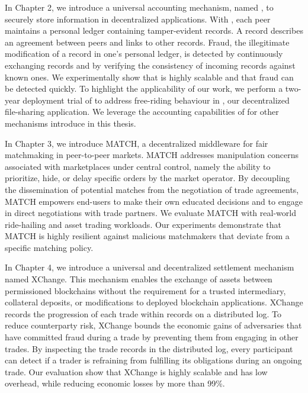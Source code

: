 In Chapter 2, we introduce a universal accounting mechanism, named \TrustChain{}, to securely store information in decentralized applications.
With \TrustChain{}, each peer maintains a personal ledger containing tamper-evident records.
A record describes an agreement between peers and links to other records.
Fraud, the illegitimate modification of a record in one's personal ledger, is detected by continuously exchanging records and by verifying the consistency of incoming records against known ones.
We experimentally show that \TrustChain{} is highly scalable and that fraud can be detected quickly.
To highlight the applicability of our work, we perform a two-year deployment trial of \TrustChain{} to address free-riding behaviour in \Tribler{}, our decentralized file-sharing application.
We leverage the accounting capabilities of \TrustChain{} for other mechanisms introduce in this thesis.

In Chapter 3, we introduce MATCH, a decentralized middleware for fair matchmaking in peer-to-peer markets.
MATCH addresses manipulation concerns associated with marketplaces under central control, namely the ability to prioritize, hide, or delay specific orders by the market operator.
By decoupling the dissemination of potential matches from the negotiation of trade agreements, MATCH empowers end-users to make their own educated decisions and to engage in direct negotiations with trade partners.
We evaluate MATCH with real-world ride-hailing and asset trading workloads.
Our experiments demonstrate that MATCH is highly resilient against malicious matchmakers that deviate from a specific matching policy.

In Chapter 4, we introduce a universal and decentralized settlement mechanism named XChange.
This mechanism enables the exchange of assets between permissioned blockchains without the requirement for a trusted intermediary, collateral deposits, or modifications to deployed blockchain applications.
XChange records the progression of each trade within records on a distributed log.
To reduce counterparty risk, XChange bounds the economic gains of adversaries that have committed fraud during a trade by preventing them from engaging in other trades.
By inspecting the trade records in the distributed log, every participant can detect if a trader is refraining from fulfilling its obligations during an ongoing trade.
Our evaluation show that XChange is highly scalable and has low overhead, while reducing economic losses by more than 99\%.

